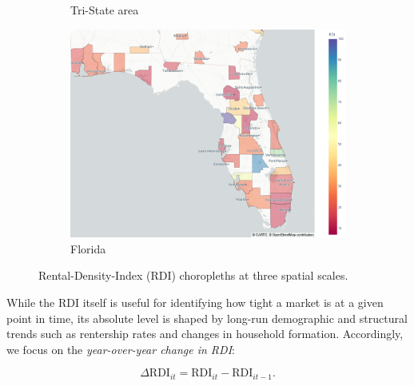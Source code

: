 \documentclass[APA,Times1COL]{WileyNJDv5} %
\begin{document}
\begin{figure}[hbt!]
\begin{subfigure}[b]{0.32\textwidth}
		\caption{Tri-State area}\label{fig:tristate_choropleth}
	\end{subfigure}\hfill
	\begin{subfigure}[b]{0.32\textwidth}
		\includegraphics[width=\linewidth]{florida.png}
		\caption{Florida}\label{fig:florida_choropleth}
	\end{subfigure}
	
	\caption{Rental-Density-Index (RDI) choropleths at three spatial scales.}
	\label{fig:choropleth_panel}
\end{figure}


While the RDI itself is useful for identifying how tight a market is at a given point in time, its absolute level is shaped by long-run demographic and structural trends such as rentership rates and changes in household formation. Accordingly, we focus on the \textit{year-over-year change in RDI}:

\begin{equation*}
	\Delta \text{RDI}_{it} = \text{RDI}_{it} - \text{RDI}_{it-1}.
\end{equation*}
\end{document}

